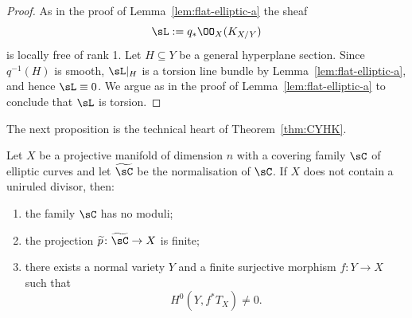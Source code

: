\begin{proof}
As in the proof of Lemma~\ref{lem:flat-elliptic-a} the sheaf
\[
\sL := q_*\OO_X(K_{X/Y})
\]
is locally free of rank 1. Let $H \subseteq Y$ be a general hyperplane section. Since $q^{-1}(H)$ is smooth, $\sL\vert_H$ is a torsion line bundle by Lemma~\ref{lem:flat-elliptic-a}, and hence $\sL \equiv 0$. We argue as in the proof of Lemma~\ref{lem:flat-elliptic-a} to conclude that $\sL$ is torsion.
\end{proof}

The next proposition is the technical heart of Theorem~\ref{thm:CYHK}.
\begin{prop}\label{new1}
Let $X$ be a projective manifold of dimension $n$ with a covering family $\sC$ of elliptic curves and let $\widetilde {\sC}$ be the normalisation of $\sC$. If $X$ does not contain a uniruled divisor, then:
\begin{enumerate}
\item \label{list-6.5.1} the family $\sC$ has no moduli;
\item \label{list-6.5.2} the projection $\widetilde p\colon \widetilde {\sC} \to X$ is finite;
\item \label{list-6.5.3} there exists a normal variety $Y$ and a finite surjective morphism $f\colon Y \to X$ such that
\[
H^0(Y,f^*T_X) \neq 0.
\]
\end{enumerate}
\end{prop}

